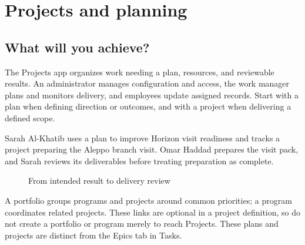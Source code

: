 \chapter{Projects and planning}
\label{ch:projects}

\section{What will you achieve?}

The Projects app organizes work needing a plan, resources, and reviewable results. An administrator manages configuration and access, the work manager plans and monitors delivery, and employees update assigned records. Start with a plan when defining direction or outcomes, and with a project when delivering a defined scope.

\begin{rcnote}
Sarah Al-Khatib uses a plan to improve Horizon visit readiness and tracks a project preparing the Aleppo branch visit. Omar Haddad prepares the visit pack, and Sarah reviews its deliverables before treating preparation as complete.
\end{rcnote}
\begin{figure}[H]
\centering
{}
\rclegend
\caption{From intended result to delivery review}
\label{fig:projects-overview}
\end{figure}

A portfolio groups programs and projects around common priorities; a program coordinates related projects. These links are optional in a project definition, so do not create a portfolio or program merely to reach Projects. These plans and projects are distinct from the Epics tab in Tasks.

